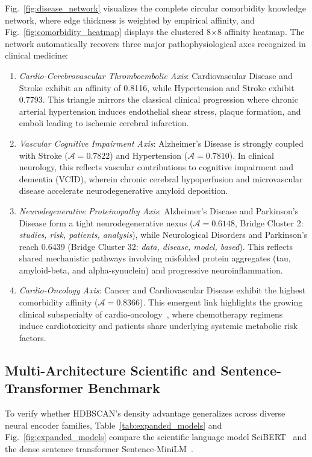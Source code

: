 \documentclass[a4paper,10pt,conference]{IEEEtran}
\begin{document}
Fig.~\ref{fig:disease_network} visualizes the complete circular comorbidity knowledge network, where edge thickness is weighted by empirical affinity, and Fig.~\ref{fig:comorbidity_heatmap} displays the clustered 8$\times$8 affinity heatmap. The network automatically recovers three major pathophysiological axes recognized in clinical medicine:
\begin{enumerate}
\item \textit{Cardio-Cerebrovascular Thromboembolic Axis}: Cardiovascular Disease and Stroke exhibit an affinity of 0.8116, while Hypertension and Stroke exhibit 0.7793. This triangle mirrors the classical clinical progression where chronic arterial hypertension induces endothelial shear stress, plaque formation, and emboli leading to ischemic cerebral infarction.
\item \textit{Vascular Cognitive Impairment Axis}: Alzheimer's Disease is strongly coupled with Stroke ($\mathcal{A}=0.7822$) and Hypertension ($\mathcal{A}=0.7810$). In clinical neurology, this reflects vascular contributions to cognitive impairment and dementia (VCID), wherein chronic cerebral hypoperfusion and microvascular disease accelerate neurodegenerative amyloid deposition.
\item \textit{Neurodegenerative Proteinopathy Axis}: Alzheimer's Disease and Parkinson's Disease form a tight neurodegenerative nexus ($\mathcal{A}=0.6148$, Bridge Cluster 2: \textit{studies, risk, patients, analysis}), while Neurological Disorders and Parkinson's reach 0.6439 (Bridge Cluster 32: \textit{data, disease, model, based}). This reflects shared mechanistic pathways involving misfolded protein aggregates (tau, amyloid-beta, and alpha-synuclein) and progressive neuroinflammation.
\item \textit{Cardio-Oncology Axis}: Cancer and Cardiovascular Disease exhibit the highest comorbidity affinity ($\mathcal{A}=0.8366$). This emergent link highlights the growing clinical subspecialty of cardio-oncology~\cite{ref39}, where chemotherapy regimens induce cardiotoxicity and patients share underlying systemic metabolic risk factors.
\end{enumerate}

\subsection{Multi-Architecture Scientific and Sentence-Transformer Benchmark}

To verify whether HDBSCAN's density advantage generalizes across diverse neural encoder families, Table~\ref{tab:expanded_models} and Fig.~\ref{fig:expanded_models} compare the scientific language model SciBERT~\cite{ref37} and the dense sentence transformer Sentence-MiniLM~\cite{ref38}.
\end{document}
